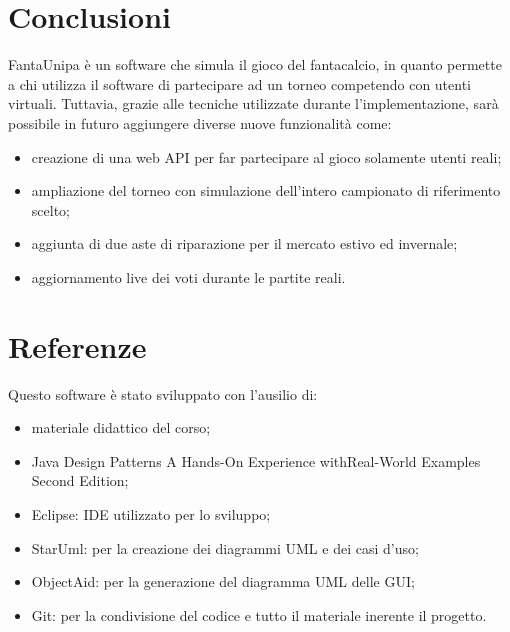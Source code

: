 \documentclass[12pt,a4paper]{article}
\begin{document}
\section{Conclusioni}
FantaUnipa è un software che simula il gioco del fantacalcio, in quanto permette a chi utilizza il software di partecipare ad un torneo competendo  con utenti virtuali. Tuttavia, grazie alle tecniche utilizzate durante l'implementazione, sarà possibile in futuro aggiungere diverse nuove funzionalità come:
\begin{itemize}
\item creazione di una web API per far partecipare al gioco solamente utenti reali;
\item ampliazione del torneo con simulazione dell'intero campionato di riferimento scelto;
\item aggiunta di due aste di riparazione per il mercato estivo ed invernale;
\item aggiornamento live dei voti durante le partite reali.
\end{itemize}
\section{Referenze}
Questo software è stato sviluppato con l'ausilio di:
\begin{itemize}
\item materiale didattico del corso;
\item Java Design Patterns A Hands-On Experience withReal-World Examples Second Edition;
\item Eclipse: IDE utilizzato per lo sviluppo;
\item StarUml: per la creazione dei diagrammi UML e dei casi d'uso;
\item ObjectAid: per la generazione del diagramma UML delle GUI;
\item Git: per la condivisione del codice e tutto il materiale inerente il progetto.
\end{itemize}
\end{document}
